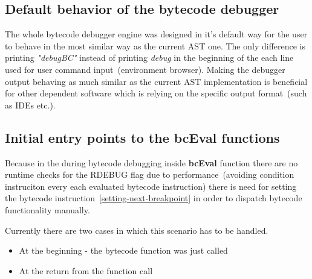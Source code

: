 \documentclass[thesis=M,english]{FITthesis}[2018/10/20]
\begin{document}


\subsection{Default behavior of the bytecode debugger}

The whole bytecode debugger engine was designed in it's default way for the user to behave in the most similar way as the current AST one. The only difference is printing \textit{"debugBC"} instead of printing \textit{debug} in the beginning of the each line used for user command input~(environment browser). Making the debugger output behaving as much similar as the current AST implementation is beneficial for other dependent software which is relying on the specific output format~(such as IDEs etc.).

\subsection{Initial entry points to the bcEval functions}

Because in the during bytecode debugging inside \textbf{bcEval} function there are no runtime checks for the RDEBUG flag due to performance~(avoiding condition instruciton every each evaluated bytecode instruction) there is need for setting the bytecode instruction~\ref{setting-next-breakpoint} in order to dispatch bytecode functionality manually.

Currently there are two cases in which this scenario has to be handled.

\begin{itemize}
	\item At the beginning - the bytecode function was just called
	\item At the return from the function call
\end{itemize}
\end{document}
